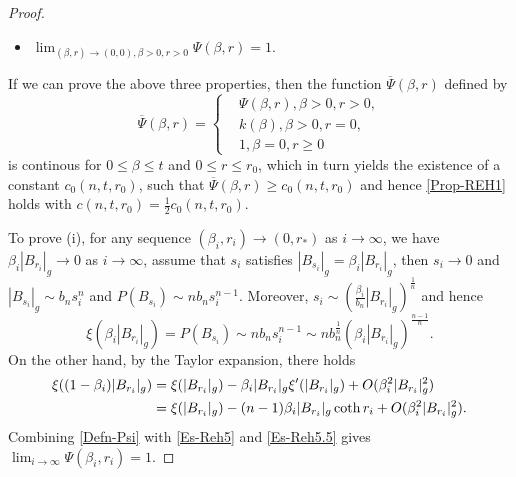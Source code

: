 \documentclass[11pt,reqno]{amsart}
\theoremstyle{definition}
\theoremstyle{remark}
\numberwithin{equation}{section}
\renewcommand{\(}{\left(}
\renewcommand{\)}{\right)}
\renewcommand{\-}{\overline}
\begin{document}
\begin{proof}
\begin{itemize}
	\item[(iii)] $\lim_{(\beta,r)\to(0,0),\beta>0,r>0}\Psi(\beta,r)=1$.
\end{itemize}
If we can prove the above three properties, then the function $\overline{\Psi}(\beta,r)$ defined by 
\begin{equation}\label{p}
	\overline{\Psi}(\beta,r)=\left\{\begin{aligned}
		&\Psi(\beta,r),\beta>0,r>0,\\
		&k(\beta), \beta>0,r=0,\\
		&1,\beta=0,r\geq 0
	\end{aligned}\right.
\end{equation}
is continous for $0\leq\beta\leq t$ and $0\leq r\leq r_0$, which in turn yields the existence of a constant $c_0(n,t,r_0)$, such that $\overline{\Psi}(\beta,r)\geq c_0(n,t,r_0)$ and hence \eqref{Prop-REH1} holds with $c(n,t,r_0)=\frac{1}{2}c_0(n,t,r_0)$.

To prove (i), for any sequence $(\beta_i,r_i)\to(0,r_{*})$ as $i\to\infty$, we have $\beta_i|B_{r_i}|_g\to 0$ as $i\to\infty$, assume that $s_i$ satisfies $|B_{s_i}|_g=\beta_i|B_{r_i}|_g$, then $s_i\to 0$ and $|B_{s_i}|_g\sim b_n s_i^n$ and $P(B_{s_i})\sim nb_ns_i^{n-1}$. Moreover, $s_i\sim\left(\frac{\beta_i}{b_n}|B_{r_i}|_g\right)^{\frac{1}{n}}$ and hence 
\begin{equation}\label{Es-Reh5}
	\xi(\beta_i|B_{r_i}|_g)=P(B_{s_i})\sim nb_ns_i^{n-1}\sim nb_n^{\frac{1}{n}}\left(\beta_i|B_{r_i}|_g\right)^{\frac{n-1}{n}}.
\end{equation}
On the other hand, by the Taylor expansion, there holds
\begin{align}
	\xi((1-\beta_i)|B_{r_i}|_g)&=\xi(|B_{r_i}|_g)-\beta_i|B_{r_i}|_g\xi'(|B_{r_i}|_g)+O(\beta_i^2|B_{r_i}|_g^2)\notag\\
	&=\xi(|B_{r_i}|_g)-(n-1)\beta_i|B_{r_i}|_g\coth{r_i}+O(\beta_i^2|B_{r_i}|_g^2).\label{Es-Reh5.5}
\end{align}
Combining \eqref{Defn-Psi} with \eqref{Es-Reh5} and \eqref{Es-Reh5.5} gives $\lim_{i\to\infty}\Psi(\beta_i,r_i)=1$.


\end{proof}
\end{document}
